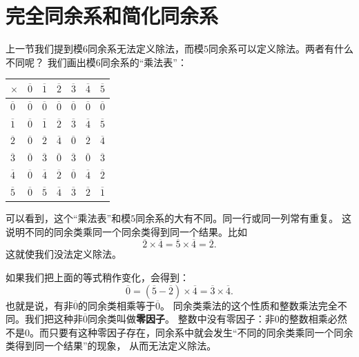 \documentclass[12pt,UTF8]{ctexbook}
\begin{document}
\section{完全同余系和简化同余系}
上一节我们提到模$6$同余系无法定义除法，而模$5$同余系可以定义除法。两者有什么不同呢？
我们画出模$6$同余系的“乘法表”：
\begin{center}
    \begin{tabular}{ | p{2em}<{\centering} | p{2em}<{\centering} | p{2em}<{\centering} | p{2em}<{\centering} | p{2em}<{\centering} | p{2em}<{\centering} | p{2em}<{\centering} | }
        \hline
            $\times$   & $\overline{0}$ & $\overline{1}$ & $\overline{2}$ & $\overline{3}$ & $\overline{4}$ & $\overline{5}$ \\ [0.5ex] 
        \hline
        $\overline{0}$ & $\overline{0}$ & $\overline{0}$ & $\overline{0}$ & $\overline{0}$ & $\overline{0}$ & $\overline{0}$ \\  
        \hline
        $\overline{1}$ & $\overline{0}$ & $\overline{1}$ & $\overline{2}$ & $\overline{3}$ & $\overline{4}$ & $\overline{5}$ \\
        \hline
        $\overline{2}$ & $\overline{0}$ & $\overline{2}$ & $\overline{4}$ & $\overline{0}$ & $\overline{2}$ & $\overline{4}$ \\
        \hline
        $\overline{3}$ & $\overline{0}$ & $\overline{3}$ & $\overline{0}$ & $\overline{3}$ & $\overline{0}$ & $\overline{3}$ \\
        \hline 
        $\overline{4}$ & $\overline{0}$ & $\overline{4}$ & $\overline{2}$ & $\overline{0}$ & $\overline{4}$ & $\overline{2}$ \\
        \hline
        $\overline{5}$ & $\overline{0}$ & $\overline{5}$ & $\overline{4}$ & $\overline{3}$ & $\overline{2}$ & $\overline{1}$ \\
        \hline
    \end{tabular}
\end{center}
可以看到，这个“乘法表”和模$5$同余系的大有不同。同一行或同一列常有重复。
这说明不同的同余类乘同一个同余类得到同一个结果。比如
$$\overline{2}\times \overline{4} = \overline{5}\times \overline{4} = \overline{2}. $$
这就使我们没法定义除法。

如果我们把上面的等式稍作变化，会得到：
$$\overline{0} = (\overline{5} - \overline{2})\times \overline{4} = \overline{3} \times \overline{4}.$$
也就是说，有非$\overline{0}$的同余类相乘等于$\overline{0}$。
同余类乘法的这个性质和整数乘法完全不同。我们把这种非$\overline{0}$同余类叫做\textbf{零因子}。
整数中没有零因子：非$0$的整数相乘必然不是$0$。而只要有这种零因子存在，同余系中就会发生“不同的同余类乘同一个同余类得到同一个结果”的现象，
从而无法定义除法。
\end{document}
